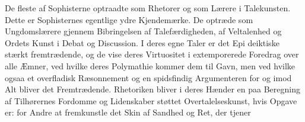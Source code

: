 \documentclass[12pt,a4paper]{book}
\begin{document}
De fleste af Sophisterne optraadte som Rhetorer og som
Lærere i Talekunsten. Dette er Sophisternes egentlige ydre
Kjendemærke. De optræde som Ungdomslærere gjennem
Bibringelsen af Talefærdigheden, af Veltalenhed og Ordets
Kunst i Debat og Discussion. I deres egne Taler er det Epi\-%
deiktiske stærkt fremtrædende, og de vise deres Virtuositet i
extemporerede Foredrag over alle Æmner, ved hvilke deres
Polymathie kommer dem til Gavn, men ved hvilke ogsaa et
overfladisk Ræsonnement og en spidsfindig Argumenteren for
og imod Alt bliver det Fremtrædende. Rhetoriken bliver i
deres Hænder en paa Beregning af Tilhørernes Fordomme og
Lidenskaber støttet Overtalelseskunst, hvis Opgave er: for
Andre at fremkunstle det Skin af Sandhed og Ret, der tjener
\end{document}
